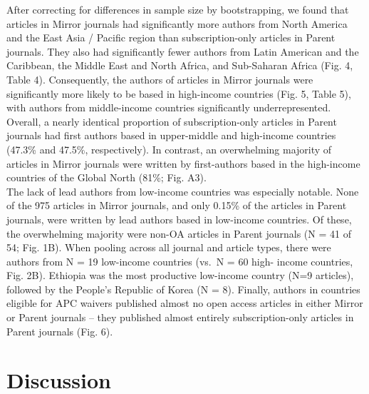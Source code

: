 \documentclass[
  english,
  man]{apa6}
\begin{document}
After correcting for differences in sample size by bootstrapping, we found that articles in Mirror journals had significantly more authors from North America and the East Asia / Pacific region than subscription-only articles in Parent journals. They also had significantly fewer authors from Latin American and the Caribbean, the Middle East and North Africa, and Sub-Saharan Africa (Fig. 4, Table 4). Consequently, the authors of articles in Mirror journals were significantly more likely to be based in high-income countries (Fig. 5, Table 5), with authors from middle-income countries significantly underrepresented. Overall, a nearly identical proportion of subscription-only articles in Parent journals had first authors based in upper-middle and high-income countries (47.3\% and 47.5\%, respectively). In contrast, an overwhelming majority of articles in Mirror journals were written by first-authors based in the high-income countries of the Global North (81\%; Fig. A3).\\
The lack of lead authors from low-income countries was especially notable. None of the 975 articles in Mirror journals, and only 0.15\% of the articles in Parent journals, were written by lead authors based in low-income countries. Of these, the overwhelming majority were non-OA articles in Parent journals (N = 41 of 54; Fig. 1B). When pooling across all journal and article types, there were authors from N = 19 low-income countries (vs.~N = 60 high- income countries, Fig. 2B). Ethiopia was the most productive low-income country (N=9 articles), followed by the People's Republic of Korea (N = 8). Finally, authors in countries eligible for APC waivers published almost no open access articles in either Mirror or Parent journals -- they published almost entirely subscription-only articles in Parent journals (Fig. 6).\\

\hypertarget{discussion}{%
\section{Discussion}\label{discussion}}
\end{document}
